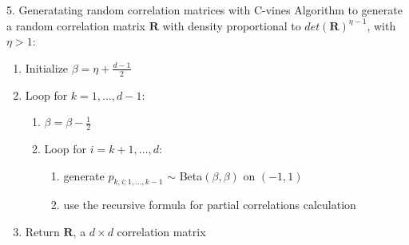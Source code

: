 \documentclass[
  ignorenonframetext,
]{beamer}
\begin{document}
\begin{frame}{5. Generatating random correlation matrices with C-vines}
\protect\hypertarget{generatating-random-correlation-matrices-with-c-vines}{}
Algorithm to generate a random correlation matrix \(\boldsymbol{R}\)
with density proportional to \(det(\boldsymbol{R})^{\eta-1}\), with
\(\eta > 1\):

\begin{enumerate}
    \item Initialize $\beta = \eta + \frac{d-1}{2}$
    \item Loop for $k = 1, \ldots, d-1$:
    \begin{enumerate}
        \item $\beta = \beta - \frac{1}{2}$
        \item Loop for $i = k+1, \ldots, d$:
        \begin{enumerate}
            \item generate $p_{k,i;1,\ldots,k-1}$ $\sim$ Beta$(\beta, \beta)$  on $(-1,1)$
            \item use the recursive formula for partial correlations calculation
        \end{enumerate}
    \end{enumerate}
    \item Return $\boldsymbol{R}$, a $d \times d$ correlation matrix
\end{enumerate}
\end{frame}
\end{document}
